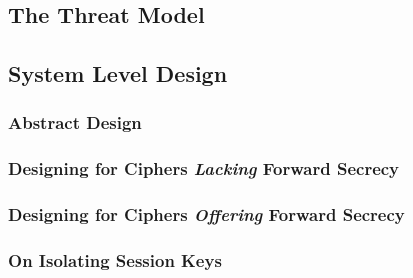 \documentclass[../main.tex]{subfiles}
\begin{document}
\subsection{The Threat Model}


\subsection{System Level Design} %


\subsubsection{Abstract Design}


\subsubsection{Designing for Ciphers \textit{Lacking} Forward Secrecy}


\subsubsection{Designing for Ciphers \textit{Offering} Forward Secrecy}


\subsubsection{On Isolating Session Keys}

\end{document}
